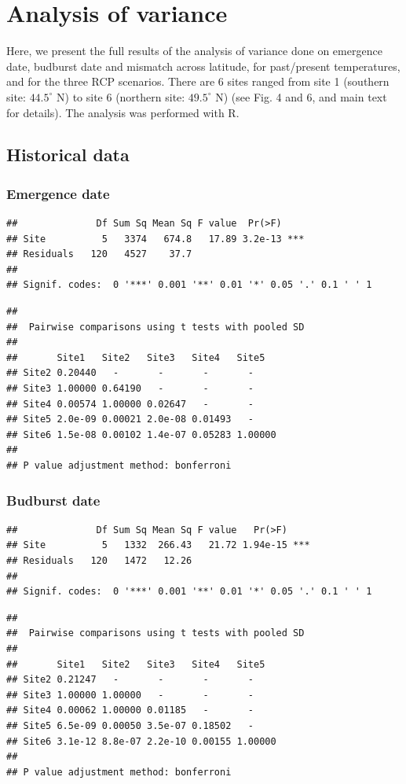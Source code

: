 \documentclass[12 pt]{article}
\begin{document}
\section{Analysis of variance}
Here, we present  the full results of the analysis of variance done on emergence date, budburst date and mismatch across latitude, for past/present temperatures, and for the three RCP scenarios. There are $6$ sites ranged from site 1 (southern site: $44.5^{\circ}$ N) to site 6 (northern site: $49.5^{\circ}$ N) (see Fig. 4 and 6, and main text for details). The analysis was performed with R.
\subsection{Historical data}
\subsubsection*{Emergence date}

\begin{verbatim}
##              Df Sum Sq Mean Sq F value  Pr(>F)    
## Site          5   3374   674.8   17.89 3.2e-13 ***
## Residuals   120   4527    37.7                    
## 
## Signif. codes:  0 '***' 0.001 '**' 0.01 '*' 0.05 '.' 0.1 ' ' 1
\end{verbatim}

\begin{verbatim}
## 
##  Pairwise comparisons using t tests with pooled SD 
## 
##       Site1   Site2   Site3   Site4   Site5  
## Site2 0.20440   -       -       -       -      
## Site3 1.00000 0.64190   -       -       -      
## Site4 0.00574 1.00000 0.02647   -       -      
## Site5 2.0e-09 0.00021 2.0e-08 0.01493   -      
## Site6 1.5e-08 0.00102 1.4e-07 0.05283 1.00000
## 
## P value adjustment method: bonferroni
\end{verbatim}

\subsubsection*{Budburst date}

\begin{verbatim}
##              Df Sum Sq Mean Sq F value   Pr(>F)    
## Site          5   1332  266.43   21.72 1.94e-15 ***
## Residuals   120   1472   12.26                     
## 
## Signif. codes:  0 '***' 0.001 '**' 0.01 '*' 0.05 '.' 0.1 ' ' 1
\end{verbatim}

\begin{verbatim}
## 
##  Pairwise comparisons using t tests with pooled SD 
##  
##       Site1   Site2   Site3   Site4   Site5  
## Site2 0.21247   -       -       -       -      
## Site3 1.00000 1.00000   -       -       -      
## Site4 0.00062 1.00000 0.01185   -       -      
## Site5 6.5e-09 0.00050 3.5e-07 0.18502   -      
## Site6 3.1e-12 8.8e-07 2.2e-10 0.00155 1.00000
## 
## P value adjustment method: bonferroni
\end{verbatim}
\end{document}
